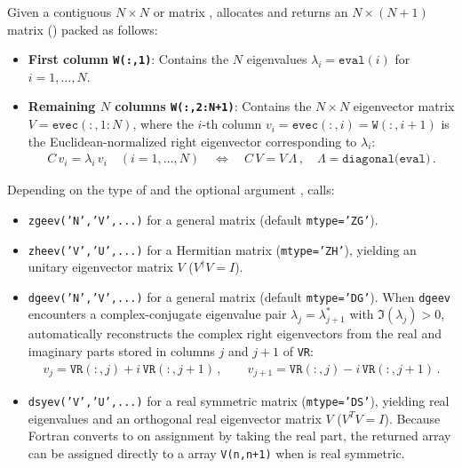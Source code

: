 Given a contiguous $N\times N$  or  matrix ,  allocates and returns an $N\times (N+1)$  matrix  () packed as follows:
\begin{itemize}
  \item \textbf{First column \texttt{W(:,1)}}: Contains the $N$ eigenvalues $\lambda_i = \texttt{eval}(i)$ for $i=1,\ldots,N$.
  \item \textbf{Remaining $N$ columns \texttt{W(:,2:N+1)}}: Contains the $N\times N$ eigenvector matrix $V = \texttt{evec}(:,1:N)$, where the $i$-th column $v_i = \texttt{evec}(:,i) = \texttt{W}(:,i+1)$ is the Euclidean-normalized right eigenvector corresponding to $\lambda_i$:
  \begin{align}
    C\, v_i = \lambda_i\, v_i \quad (i = 1,\ldots,N) \quad \Longleftrightarrow \quad C\, V = V\, \Lambda\, , \quad \Lambda = \texttt{diagonal(eval)}\, .
  \end{align}
\end{itemize}
Depending on the type of  and the optional argument ,  calls:
\begin{itemize}
  \item \texttt{zgeev('N','V',...)} for a general  matrix (default \texttt{mtype='ZG'}).
  \item \texttt{zheev('V','U',...)} for a Hermitian  matrix (\texttt{mtype='ZH'}), yielding an unitary eigenvector matrix $V$ ($V^\dagger V = I$).
  \item \texttt{dgeev('N','V',...)} for a general  matrix (default \texttt{mtype='DG'}). When \texttt{dgeev} encounters a complex-conjugate eigenvalue pair $\lambda_j = \lambda_{j+1}^*$ with $\Im(\lambda_j) > 0$,  automatically reconstructs the complex right eigenvectors from the real and imaginary parts stored in columns $j$ and $j+1$ of \texttt{VR}:
  \begin{align}
    v_j = \texttt{VR}(:,j) + i\,\texttt{VR}(:,j+1)\, , \qquad v_{j+1} = \texttt{VR}(:,j) - i\,\texttt{VR}(:,j+1)\, .
  \end{align}
  \item \texttt{dsyev('V','U',...)} for a real symmetric  matrix (\texttt{mtype='DS'}), yielding real eigenvalues and an orthogonal real eigenvector matrix $V$ ($V^T V = I$). Because Fortran converts  to  on assignment by taking the real part, the returned array can be assigned directly to a  array \texttt{V(n,n+1)} when  is real symmetric.
\end{itemize}

